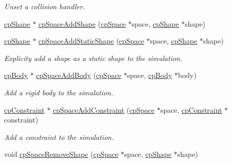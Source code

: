 \begin{DoxyCompactItemize}
\begin{DoxyCompactList}\small\item\em Unset a collision handler. \end{DoxyCompactList}\item 
\hyperlink{structcp_shape}{cp\-Shape} $\ast$ \hyperlink{group__cp_space_ga5fd6bdb0b93c93a93eeab0611e070080}{cp\-Space\-Add\-Shape} (\hyperlink{structcp_space}{cp\-Space} $\ast$space, \hyperlink{structcp_shape}{cp\-Shape} $\ast$shape)
\item 
\hypertarget{group__cp_space_gab4c74f809628d9b8330f3e2259575759}{\hyperlink{structcp_shape}{cp\-Shape} $\ast$ \hyperlink{group__cp_space_gab4c74f809628d9b8330f3e2259575759}{cp\-Space\-Add\-Static\-Shape} (\hyperlink{structcp_space}{cp\-Space} $\ast$space, \hyperlink{structcp_shape}{cp\-Shape} $\ast$shape)}\label{group__cp_space_gab4c74f809628d9b8330f3e2259575759}

\begin{DoxyCompactList}\small\item\em Explicity add a shape as a static shape to the simulation. \end{DoxyCompactList}\item 
\hypertarget{group__cp_space_ga0aa27863e6410512b73347e25e97b215}{\hyperlink{structcp_body}{cp\-Body} $\ast$ \hyperlink{group__cp_space_ga0aa27863e6410512b73347e25e97b215}{cp\-Space\-Add\-Body} (\hyperlink{structcp_space}{cp\-Space} $\ast$space, \hyperlink{structcp_body}{cp\-Body} $\ast$body)}\label{group__cp_space_ga0aa27863e6410512b73347e25e97b215}

\begin{DoxyCompactList}\small\item\em Add a rigid body to the simulation. \end{DoxyCompactList}\item 
\hypertarget{group__cp_space_gad3fc61e25869131d30dca7b1a33ba102}{\hyperlink{structcp_constraint}{cp\-Constraint} $\ast$ \hyperlink{group__cp_space_gad3fc61e25869131d30dca7b1a33ba102}{cp\-Space\-Add\-Constraint} (\hyperlink{structcp_space}{cp\-Space} $\ast$space, \hyperlink{structcp_constraint}{cp\-Constraint} $\ast$constraint)}\label{group__cp_space_gad3fc61e25869131d30dca7b1a33ba102}

\begin{DoxyCompactList}\small\item\em Add a constraint to the simulation. \end{DoxyCompactList}\item 
\hypertarget{group__cp_space_gaba39a56c766cf5094876685d7ed63734}{void \hyperlink{group__cp_space_gaba39a56c766cf5094876685d7ed63734}{cp\-Space\-Remove\-Shape} (\hyperlink{structcp_space}{cp\-Space} $\ast$space, \hyperlink{structcp_shape}{cp\-Shape} $\ast$shape)}\label{group__cp_space_gaba39a56c766cf5094876685d7ed63734}


\end{DoxyCompactItemize}

